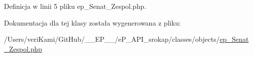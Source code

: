 Definicja w linii 5 pliku ep\-\_\-\-Senat\-\_\-\-Zespol.\-php.



Dokumentacja dla tej klasy została wygenerowana z pliku\-:\begin{DoxyCompactItemize}
\item 
/\-Users/veri\-Kami/\-Git\-Hub/\-\_\-\-\_\-\-E\-P\-\_\-\-\_\-/e\-P\-\_\-\-A\-P\-I\-\_\-srokap/classes/objects/\hyperlink{ep___senat___zespol_8php}{ep\-\_\-\-Senat\-\_\-\-Zespol.\-php}\end{DoxyCompactItemize}
